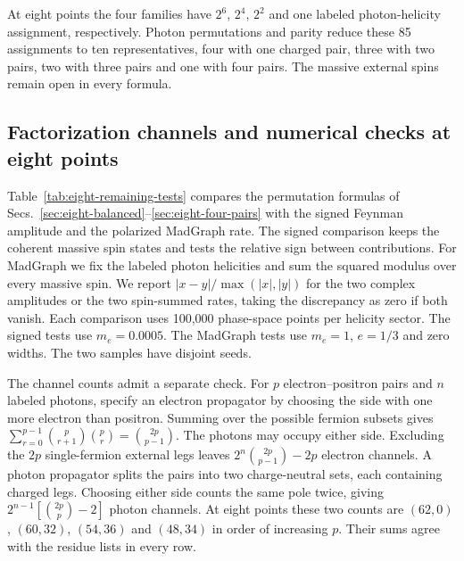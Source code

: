 At eight points the four families have $2^6$, $2^4$, $2^2$ and one
labeled photon-helicity assignment, respectively. Photon permutations
and parity reduce these 85 assignments to ten representatives, four
with one charged pair, three with two pairs, two with three pairs and
one with four pairs. The massive external spins remain open in every
formula.

\subsection{Factorization channels and numerical checks at eight points}
\label{sec:eight-remaining-tests}

Table~\ref{tab:eight-remaining-tests} compares the permutation formulas of
Secs.~\ref{sec:eight-balanced}--\ref{sec:eight-four-pairs} with the signed Feynman amplitude and the polarized MadGraph rate.
The signed comparison keeps the coherent massive spin states and tests
the relative sign between contributions. For MadGraph we fix the labeled
photon helicities and sum the squared modulus over every massive spin.
We report $|x-y|/\max(|x|,|y|)$ for the two complex amplitudes or
the two spin-summed rates, taking the discrepancy as zero if both vanish.
Each comparison uses 100,000 phase-space points per helicity sector.
The signed tests use $m_e=0.0005$. The MadGraph tests
use $m_e=1$, $e=1/3$ and zero widths. The two samples have disjoint seeds.

The channel counts admit a separate check. For $p$ electron--positron
pairs and $n$ labeled photons, specify an electron propagator by choosing
the side with one more electron than positron. Summing over the possible
fermion subsets gives $\sum_{r=0}^{p-1}\binom{p}{r+1}\binom{p}{r}=\binom{2p}{p-1}$. The photons may occupy either
side. Excluding the $2p$ single-fermion external legs leaves
$2^n\binom{2p}{p-1}-2p$ electron channels. A photon propagator splits
the pairs into two charge-neutral sets, each containing charged legs.
Choosing either side counts the same pole twice, giving
$2^{n-1}[\binom{2p}{p}-2]$ photon channels. At eight points these two
counts are $(62,0)$, $(60,32)$, $(54,36)$ and $(48,34)$ in order of
increasing $p$. Their sums agree with the residue lists in every row.


